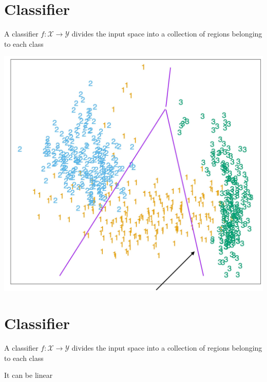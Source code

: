 \documentclass[10pt]{article}
\begin{document}
\section*{Classifier}
A classifier $f: \mathscr{X} \rightarrow \mathscr{Y}$ divides the input space into a collection of regions belonging to each class

\begin{center}
\includegraphics[max width=\textwidth]{2023_12_30_cf784c471dfd1dd5afbag-07}
\end{center}

\section*{Classifier}
A classifier $f: \mathscr{X} \rightarrow \mathcal{Y}$ divides the input space into a collection of regions belonging to each class

It can be linear
\end{document}
